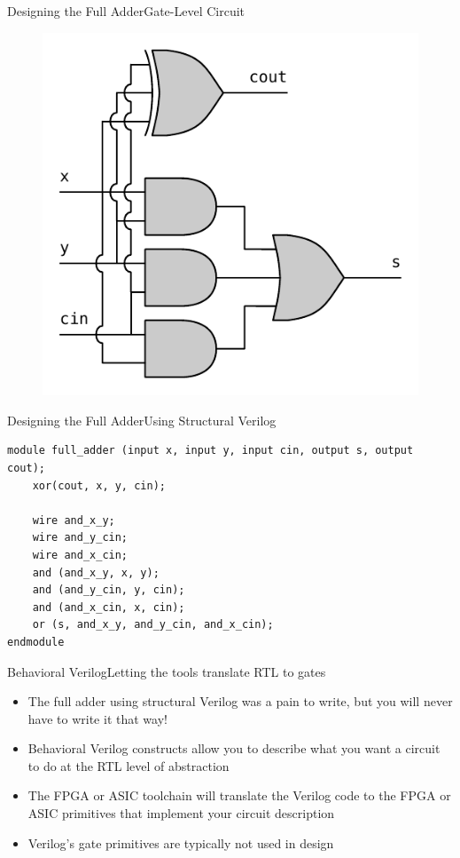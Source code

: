 \documentclass{beamer}
\begin{document}
\begin{frame}{Designing the Full Adder}{Gate-Level Circuit}
\begin{figure}[H]
\centering
\includegraphics{full_adder_gates.pdf}
\end{figure}
\end{frame}

\begin{frame}[fragile]{Designing the Full Adder}{Using Structural Verilog}
\begin{verbatim}
module full_adder (input x, input y, input cin, output s, output cout);
	xor(cout, x, y, cin);
	
	wire and_x_y;
	wire and_y_cin;
	wire and_x_cin;
	and (and_x_y, x, y);
	and (and_y_cin, y, cin);
	and (and_x_cin, x, cin);
	or (s, and_x_y, and_y_cin, and_x_cin);
endmodule
\end{verbatim}
\end{frame}

\begin{frame}{Behavioral Verilog}{Letting the tools translate RTL to gates}
	\begin{itemize}
		\item The full adder using structural Verilog was a pain to write, but you will never have to write it that way!
		\item Behavioral Verilog constructs allow you to describe what you want a circuit to do at the RTL level of abstraction
		\item The FPGA or ASIC toolchain will translate the Verilog code to the FPGA or ASIC primitives that implement your circuit description
		\item Verilog's gate primitives are typically not used in design
	\end{itemize}
\end{frame}
\end{document}
